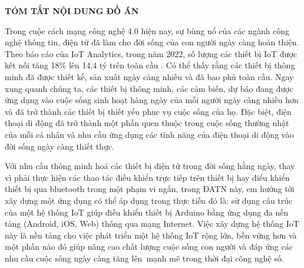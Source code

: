 \documentclass[../DoAn.tex]{subfiles}
\begin{document}
\begin{center}
    \Large{\textbf{TÓM TẮT NỘI DUNG ĐỒ ÁN}}\\
\end{center}
\vspace{1cm}

Trong cuộc cách mạng công nghệ 4.0 hiện nay, sự bùng nổ của các ngành công nghệ thông tin, điện tử đã làm cho đời sống của con người ngày càng hoàn thiện. Theo báo cáo của IoT Analytics, trong năm 2022, số lượng các thiết bị IoT được kết nối tăng 18\% lên 14,4 tỷ trên toàn cầu \cite{IoTAnalytics}. Có thể thấy rằng các thiết bị thông minh đã được thiết kế, sản xuất ngày càng nhiều và đã bao phủ toàn cầu. Ngay xung quanh chúng ta, các thiết bị thông minh, các cảm biến, dự báo đang được ứng dụng vào cuộc sống sinh hoạt hàng ngày của mỗi người ngày càng nhiều hơn và đã trở thành các thiết bị thiết yếu phục vụ cuộc sống của họ. Đặc biệt, điện thoại di động đã trở thành một phần quen thuộc trong cuộc sống thường nhật của mỗi cá nhân và nhu cầu ứng dụng các tính năng của điện thoại di động vào đời sống ngày càng thiết thực.

Với nhu cầu thông minh hoá các thiết bị điện tử trong đời sống hằng ngày, thay vì phải thực hiện các thao tác điều khiển trực tiếp trên thiết bị hay điểu khiển thiết bị qua bluetooth trong một phạm vi ngắn, trong ĐATN này, em hướng tới xây dựng một ứng dụng có thể áp dụng trong thực tiễn đó là: sử dụng cấu trúc của một hệ thống IoT giúp điều khiển thiết bị Arduino bằng ứng dụng đa nền tảng (Android, iOS, Web) thông qua mạng Internet. Việc xây dựng hệ thống IoT này là nền tảng cho việc phát triển một hệ thống IoT rộng lớn, bền vững hơn và một phần nào đó giúp nâng cao chất lượng cuộc sống con người và đáp ứng các nhu cầu cuộc sống ngày càng tăng lên mạnh mẽ trong thời đại công nghệ số. 
\end{document}
